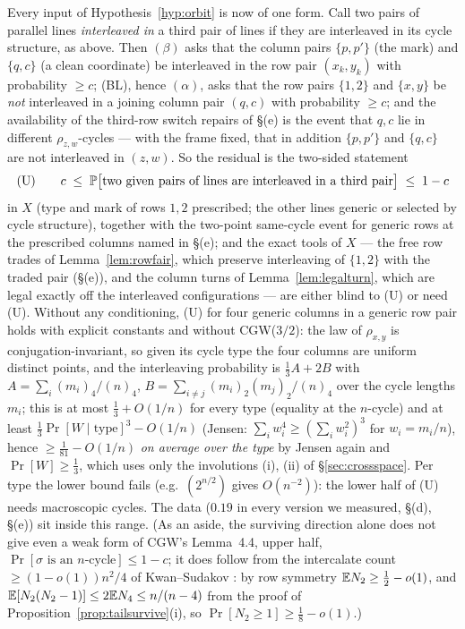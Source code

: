 Every input of Hypothesis~\ref{hyp:orbit} is now of one form.  Call two
pairs of parallel lines \emph{interleaved in} a third pair of lines
if they are interleaved in its cycle structure, as above.  Then
$(\beta)$ asks that the column pairs $\{p,p'\}$ (the mark) and
$\{q,c\}$ (a clean coordinate) be interleaved in the row pair
$(x_k,y_k)$ with probability $\ge c$; (BL), hence $(\alpha)$, asks
that the row pairs $\{1,2\}$ and $\{x,y\}$ be \emph{not} interleaved in
a joining column pair $(q,c)$ with probability $\ge c$; and the
availability of the third-row switch repairs of \S(e) is the event
that $q,c$ lie in different $\rho_{z,w}$-cycles --- with the frame
fixed, that in addition $\{p,p'\}$ and $\{q,c\}$ are not interleaved
in $(z,w)$.  So the residual is the two-sided statement
\[
\textup{(U)}\qquad c\;\le\;\Pr\bigl[\text{two given pairs of lines are interleaved in a third pair}\bigr]\;\le\;1-c
\]
in $X$ (type and mark of rows $1,2$ prescribed; the other lines
generic or selected by cycle structure), together with the two-point
same-cycle event for generic rows at the prescribed columns named in
\S(e); and the exact tools of $X$
--- the free row trades of Lemma~\ref{lem:rowfair}, which preserve
interleaving of $\{1,2\}$ with the traded pair (\S(e)), and the column
turns of Lemma~\ref{lem:legalturn}, which are legal exactly off the
interleaved configurations --- are either blind to (U) or need (U).
Without any conditioning, (U) for four generic columns in a generic
row pair holds with explicit constants and without CGW($3/2$): the law
of $\rho_{x,y}$ is conjugation-invariant, so given its cycle type the
four columns are uniform distinct points, and the interleaving
probability is $\tfrac13A+2B$ with $A=\sum_i(m_i)_4/(n)_4$,
$B=\sum_{i\ne j}(m_i)_2(m_j)_2/(n)_4$ over the cycle lengths $m_i$;
this is at most $\tfrac13+O(1/n)$ for every type (equality at the
$n$-cycle) and at least $\tfrac13\Pr[W\mid\text{type}]^3-O(1/n)$
(Jensen: $\sum_iw_i^4\ge(\sum_iw_i^2)^3$ for $w_i=m_i/n$), hence
$\ge\tfrac1{81}-O(1/n)$ \emph{on average over the type} by Jensen
again and $\Pr[W]\ge\tfrac13$, which uses only the involutions (i),
(ii) of \S\ref{sec:crossspace}.  Per type the lower bound fails
(e.g.\ $(2^{n/2})$ gives $O(n^{-2})$): the lower half of (U) needs
macroscopic cycles.  The data ($0.19$ in every version we measured,
\S(d), \S(e)) sit inside this range.
(As an aside, the surviving direction alone does not give even a weak
form of CGW's Lemma~4.4, upper half, $\Pr[\sigma\text{ is an $n$-cycle}]\le1-c$;
it does follow from the intercalate count $\ge(1-o(1))n^2/4$ of
Kwan--Sudakov \cite{KS18}: by row symmetry $\E N_2\ge\tfrac12-o(1)$,
and $\E[N_2(N_2-1)]\le2\E N_4\le n/(n-4)$ from the proof of
Proposition~\ref{prop:tailsurvive}(i), so $\Pr[N_2\ge1]\ge\tfrac18-o(1)$.)

